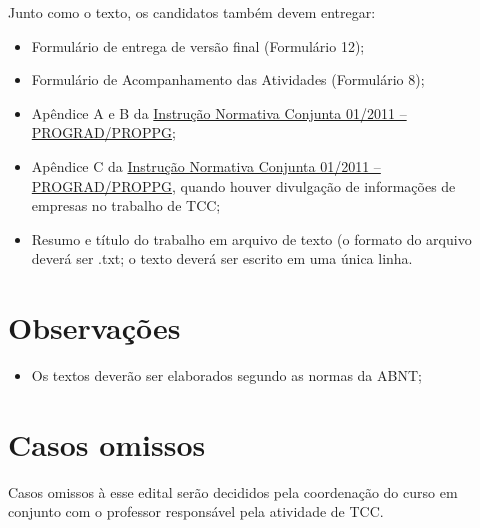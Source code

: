 \documentclass[a4paper, 12pt]{article}
\begin{document}
 	Junto como o texto, os candidatos também devem entregar:
	
	\begin{itemize}
		\item Formulário de entrega de versão final (Formulário 12);
		\item Formulário de Acompanhamento das Atividades (Formulário 8);		
		\item Apêndice A e B da \href{http://www.utfpr.edu.br/cursos/coordenacoes/stricto-sensu/ppgta/documentos/normas-para-entrega-da-versao-final/in-conjunta-01-2011-2013-prograd-proppg-dissertacao.pdf/view}{Instrução Normativa Conjunta 01/2011 – PROGRAD/PROPPG};
		\item Apêndice C da \href{http://www.utfpr.edu.br/cursos/coordenacoes/stricto-sensu/ppgta/documentos/normas-para-entrega-da-versao-final/in-conjunta-01-2011-2013-prograd-proppg-dissertacao.pdf/view}{Instrução Normativa Conjunta 01/2011 – PROGRAD/PROPPG}, quando houver divulgação de informações de empresas no trabalho de TCC;
		\item Resumo e título do trabalho em arquivo de texto (o formato do arquivo deverá ser .txt; o texto deverá ser escrito em uma única linha.
	\end{itemize}
	
	\section{Observações}
	
	\begin{itemize}
		\item Os textos deverão ser elaborados segundo as normas da ABNT;
		
	\end{itemize}

	\section{Casos omissos}
	
	Casos omissos à esse edital serão decididos pela coordenação do curso em conjunto com o professor responsável pela atividade de TCC.
	
\end{document}
